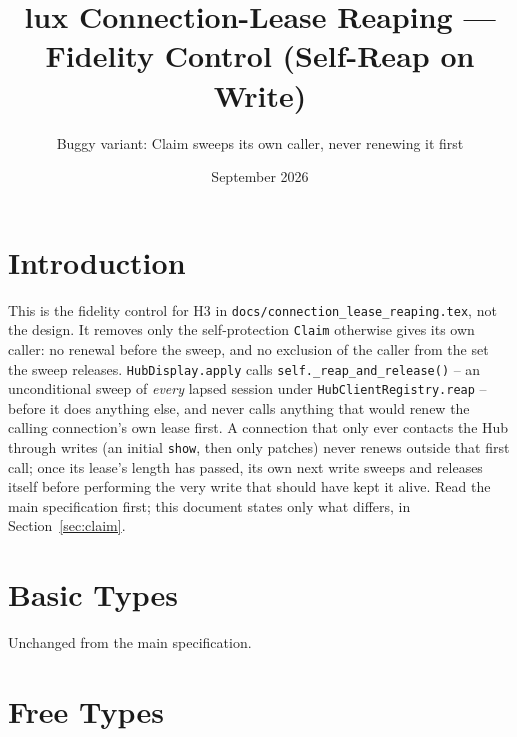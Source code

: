 \documentclass[a4paper,10pt,fleqn]{article}
\begin{document}
\title{lux Connection-Lease Reaping --- Fidelity Control (Self-Reap on Write)}
\author{Buggy variant: Claim sweeps its own caller, never renewing it first}
\date{September 2026}
\maketitle

\section{Introduction}

This is the fidelity control for H3 in
\texttt{docs/connection\_lease\_reaping.tex}, not the design. It removes
only the self-protection \texttt{Claim} otherwise gives its own caller: no
renewal before the sweep, and no exclusion of the caller from the set the
sweep releases. \texttt{HubDisplay.apply} calls
\texttt{self.\_reap\_and\_release()} -- an unconditional sweep of
\emph{every} lapsed session under \texttt{HubClientRegistry.reap} --
before it does anything else, and never calls anything that would renew
the calling connection's own lease first. A connection that only ever
contacts the Hub through writes (an initial \texttt{show}, then only
patches) never renews outside that first call; once its lease's length
has passed, its own next write sweeps and releases itself before
performing the very write that should have kept it alive. Read the main
specification first; this document states only what differs, in
Section~\ref{sec:claim}.

\section{Basic Types}

\begin{zed}
\end{zed}

Unchanged from the main specification.

\section{Free Types}
\end{document}
